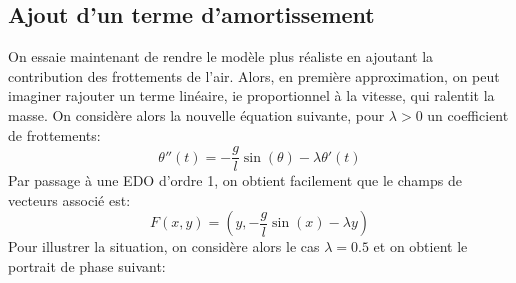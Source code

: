    \subsection{Ajout d'un terme d'amortissement}
      On essaie maintenant de rendre le modèle plus réaliste en ajoutant la contribution des frottements de l'air. Alors, en première approximation, on peut imaginer rajouter un terme linéaire, ie proportionnel à la vitesse, qui ralentit la masse. On considère alors la nouvelle équation suivante, pour \(\lambda > 0\) un coefficient de frottements:
      \[
         \theta''(t) = - \frac{g}{l}\sin(\theta) - \lambda \theta'(t)
      \]
      Par passage à une EDO d'ordre 1, on obtient facilement que le champs de vecteurs associé est:
      \[ 
         F(x, y) = \left(y, - \frac{g}{l}\sin(x) - \lambda y \right)
      \]
      Pour illustrer la situation, on considère alors le cas \( \lambda = 0.5 \) et on obtient le portrait de phase suivant:
